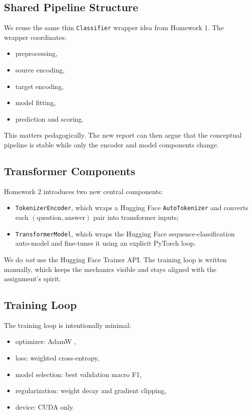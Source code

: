\documentclass[12pt]{fphw}
\begin{document}
\subsection{Shared Pipeline Structure}

We reuse the same thin \texttt{Classifier} wrapper idea from Homework 1. The wrapper coordinates:
\begin{itemize}
	\item preprocessing,
	\item source encoding,
	\item target encoding,
	\item model fitting,
	\item prediction and scoring.
\end{itemize}

This matters pedagogically. The new report can then argue that the conceptual pipeline is stable while only the encoder and model components change.

\subsection{Transformer Components}

Homework 2 introduces two new central components:
\begin{itemize}
	\item \texttt{TokenizerEncoder}, which wraps a Hugging Face \texttt{AutoTokenizer} and converts each $(\text{question}, \text{answer})$ pair into transformer inputs;
	\item \texttt{TransformerModel}, which wraps the Hugging Face sequence-classification auto-model and fine-tunes it using an explicit PyTorch loop.
\end{itemize}

We do \emph{not} use the Hugging Face Trainer API. The training loop is written manually, which keeps the mechanics visible and stays aligned with the assignment's spirit.

\subsection{Training Loop}

The training loop is intentionally minimal:
\begin{itemize}
	\item optimizer: AdamW \cite{adamw},
	\item loss: weighted cross-entropy,
	\item model selection: best validation macro F1,
	\item regularization: weight decay and gradient clipping,
	\item device: CUDA only.
\end{itemize}
\end{document}
